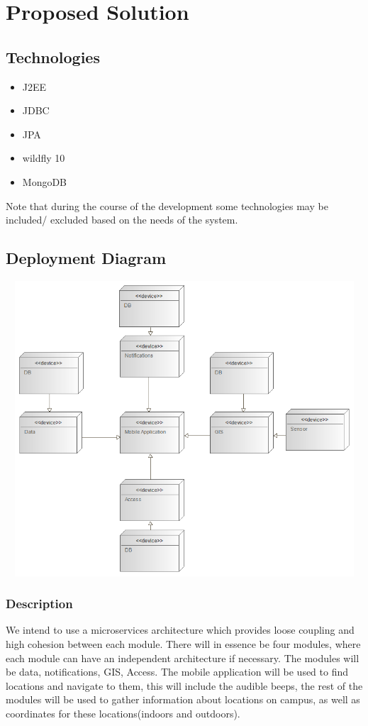 \documentclass{article}
\begin{document}
\section{Proposed Solution}

\subsection{Technologies}
\begin{itemize}
	\item J2EE
	\item JDBC
	\item JPA
	\item wildfly 10
	\item MongoDB
\end{itemize}
Note that during the course of the development some technologies may be included/ excluded based on the needs of the system.
\subsection{Deployment Diagram}
\includegraphics[width=20cm,height=11cm,keepaspectratio]{dd1.png} \\

\subsubsection{Description}
We intend to use a microservices architecture which provides loose coupling and high cohesion between each module. There will in essence be four modules, where each module can have an independent architecture if necessary. The modules will be data, notifications, GIS, Access. The mobile application will be used to find locations and navigate to them, this will include the audible beeps, the rest of the modules will be used to gather information about locations on campus, as well as coordinates for these locations(indoors and outdoors).
\end{document}
